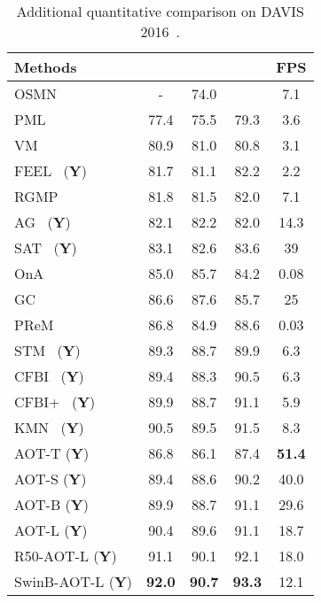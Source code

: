 \documentclass{article}
\begin{document}
 \begin{table}[t!]
\begin{center}
\vspace{-6.5mm}
\caption{Additional quantitative comparison on DAVIS 2016~\cite{davis2016}.}\label{tab:full_davis2016}

\setlength{\tabcolsep}{3pt}
\begin{tabular}{l c c c c}
\toprule[1.5pt]
 Methods  &  &  &  & FPS \\
\midrule[1pt]
OSMN~\cite{osmn}  &  - & 74.0  &   & 7.1 \\
PML~\cite{pml}  &  77.4 & 75.5  & 79.3  & 3.6 \\
VM~\cite{videomatch}  &   80.9  & 81.0  & 80.8  & 3.1 \\
FEEL~\cite{feelvos} (\textbf{Y})  & 81.7  &  81.1 &  82.2 & 2.2 \\
RGMP~\cite{rgmp}  & 81.8 &  81.5 & 82.0  & 7.1 \\
AG~\cite{agame} (\textbf{Y})  &  82.1 & 82.2  & 82.0  & 14.3 \\
SAT~\cite{realtimevos1} (\textbf{Y})  &  83.1 & 82.6  & 83.6  & 39 \\
OnA~\cite{onavos}   & 85.0  & 85.7  & 84.2  & 0.08 \\
GC~\cite{realtimevos2}   & 86.6  & 87.6  & 85.7  & 25 \\
PReM~\cite{premvos}   & 86.8  & 84.9  & 88.6  & 0.03 \\
STM~\cite{spacetime} (\textbf{Y})  &  89.3 & 88.7  & 89.9  & 6.3 \\
CFBI~\cite{cfbi} (\textbf{Y})  & 89.4  & 88.3 & 90.5  & 6.3 \\
CFBI+~\cite{cfbip} (\textbf{Y})  & 89.9  & 88.7 & 91.1  & 5.9 \\
KMN~\cite{KMN} (\textbf{Y})  &  90.5 & {89.5}  & {91.5}  & 8.3 \\
\hline
AOT-T (\textbf{Y}) &  86.8  & 86.1 & 87.4 & \textbf{51.4} \\
AOT-S (\textbf{Y}) &  89.4  & 88.6 & 90.2 & 40.0 \\
AOT-B (\textbf{Y}) &  89.9  & 88.7 & 91.1 & 29.6 \\
AOT-L (\textbf{Y}) &  {90.4}  & {89.6} & {91.1} & 18.7 \\
R50-AOT-L (\textbf{Y}) &  {91.1}  & {90.1} & {92.1} & 18.0 \\
SwinB-AOT-L (\textbf{Y}) &  \textbf{92.0}  & \textbf{90.7} & \textbf{93.3} & 12.1 \\
\bottomrule[1.5pt]

\end{tabular}
\end{center}
\end{table} 
\end{document}
